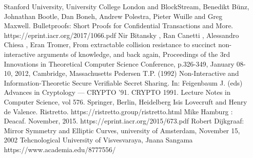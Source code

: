 \documentclass{article}
\begin{document}
\begin{thebibliography}{99}

 Stanford University, University College London and BlockStream, Benedikt Bünz, Johnathan Bootle, Dan Boneh, Andrew Polestra, Pieter Wuille and Greg Maxwell. Bulletproofs: Short Proofs for Confidential Transactions and More.\\ https://eprint.iacr.org/2017/1066.pdf
 Nir Bitansky , Ran Canetti , Alessandro Chiesa , Eran Tromer, From extractable collision resistance to succinct non-interactive arguments of knowledge, and back again, Proceedings of the 3rd Innovations in Theoretical Computer Science Conference, p.326-349, January 08-10, 2012, Cambridge, Massachusetts
 Pedersen T.P. (1992) Non-Interactive and Information-Theoretic Secure Verifiable Secret Sharing. In: Feigenbaum J. (eds) Advances in Cryptology — CRYPTO ’91. CRYPTO 1991. Lecture Notes in Computer Science, vol 576. Springer, Berlin, Heidelberg
 Isis Lovecruft and Henry de Valence. Ristretto. https://ristretto.group/ristretto.html
 Mike Hamburg : Deacaf. November, 2015. https://eprint.iacr.org/2015/673.pdf
Robert Dijkgraaf: Mirror Symmetry and Elliptic Curves, university of Amsterdam, November 15, 2002
 Tehcnological University of Visvesvaraya, Jnana Sangama https://www.academia.edu/8777556/

\end{thebibliography}
\end{document}
